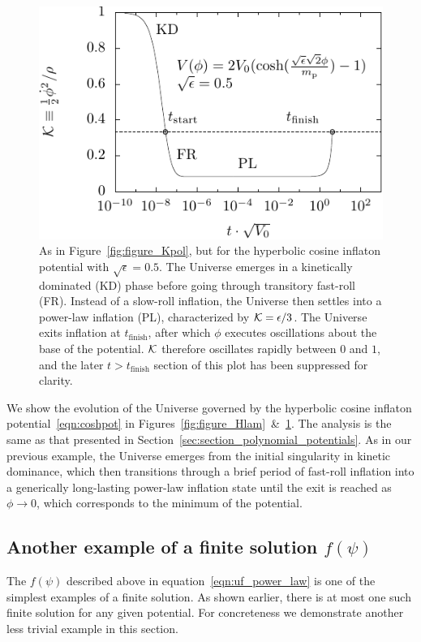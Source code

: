 %
\begin{figure}[ht]
  \includegraphics[width=\textwidth]{chapter_kinetic_dominance/figures/Klam}
  \caption{As in Figure~\protect\ref{fig:figure_Kpol}, but for the hyperbolic cosine inflaton potential with $\sqrt{\epsilon}=0.5$. The Universe emerges in a kinetically dominated (KD) phase before going through transitory fast-roll (FR). Instead of a slow-roll inflation, the Universe then settles into a power-law inflation (PL), characterized by $\mathcal{K}=\epsilon/3$. The Universe exits inflation at $t_\mathrm{finish}$, after which $\phi$ executes oscillations about the base of the potential. $\mathcal{K}$ therefore oscillates rapidly between $0$ and $1$, and the later $t>t_\mathrm{finish}$ section of this plot has been suppressed for clarity.\label{fig:figure_Klam}}
\end{figure}
%

We show the evolution of the Universe governed by the hyperbolic cosine inflaton potential~\eqref{eqn:coshpot} in Figures~\ref{fig:figure_Hlam}~\&~\ref{fig:figure_Klam}. The analysis is the same as that presented in Section~\ref{sec:section_polynomial_potentials}.  As in our previous example, the Universe emerges from the initial singularity in kinetic dominance, which then transitions through a brief period of fast-roll inflation into a generically long-lasting power-law inflation state until the exit is reached as $\phi\rightarrow0$, which corresponds to the minimum of the potential.  

\subsection{Another example of a finite solution $f(\psi)$}
The $f(\psi)$ described above in equation~\eqref{eqn:uf_power_law} is one of the simplest examples of a finite solution. As shown earlier, there is at most one such finite solution for any given potential. For concreteness we demonstrate another less trivial example in this section.


